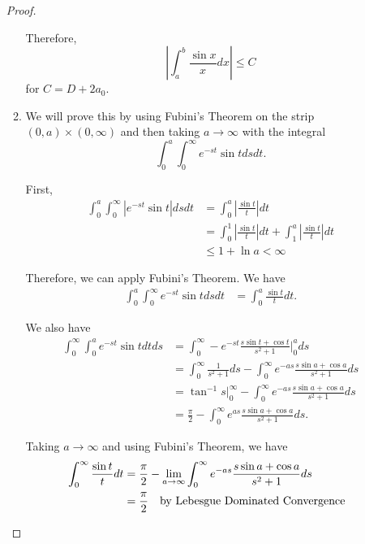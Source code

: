 \documentclass[a4paper]{article}
\begin{document}
\begin{enumerate}
\begin{proof}
\begin{enumerate}
        Therefore,
        \[ \left| \int_{a}^{b} \frac{\sin x}{x} dx \right| \leq C \]
        for $C = D + 2 a_0$.

      \item
        We will prove this by using Fubini's Theorem on the strip $(0,a) \times (0, \infty)$ and then taking $a \to \infty$ with the integral
        \[ \int_{0}^{a} \int_{0}^{\infty} e^{-st} \sin t ds dt .\]

        First,
        \begin{align*}
          \int_{0}^{a} \int_{0}^{\infty} \left| e^{-st} \sin t \right| ds dt &= \int_{0}^{a} \left| \frac{\sin t}{t} \right| dt \\
          &= \int_{0}^{1} \left| \frac{\sin t}{t} \right| dt + \int_{1}^{a} \left| \frac{\sin t}{t} \right| dt \\
          &\leq 1 + \ln a < \infty
        \end{align*}

        Therefore, we can apply Fubini's Theorem. We have
        \begin{align*}
          \int_{0}^{a} \int_{0}^{\infty} e^{-st} \sin t ds dt &= \int_{0}^{a} \frac{\sin t}{t} dt.
        \end{align*}

        We also have
        \begin{align*}
          \int_{0}^{\infty} \int_{0}^{a} e^{-st} \sin t dt ds &= \int_{0}^{\infty} -e^{-st} \frac{s \sin t + \cos t}{s^2+1} \bigg|_{0}^a ds \\
          &= \int_{0}^{\infty} \frac{1}{s^2 + 1} ds - \int_{0}^{\infty} e^{-as} \frac{s \sin a + \cos a}{s^2 + 1} ds \\
          &= \tan^{-1} s \big|_0^\infty - \int_{0}^{\infty} e^{-as} \frac{s \sin a + \cos a}{s^2 + 1} ds \\
          &= \frac{\pi}{2} - \int_{0}^{\infty} e^{as} \frac{s \sin a + \cos a}{s^2+1} ds.
        \end{align*}

        Taking $a \to \infty$ and using Fubini's Theorem, we have
        \begin{align*}
          \int_{0}^{\infty} \frac{\sin t}{t} dt &= \frac{\pi}{2} - \lim_{a \to \infty} \int_{0}^{\infty} e^{-as} \frac{s \sin a + \cos a}{s^2 + 1} ds
          \\
          &= \frac{\pi}{2} \quad \parbox{6cm}{by Lebesgue Dominated Convergence}
        \end{align*}


\end{enumerate}
\end{proof}
\end{enumerate}
\end{document}
